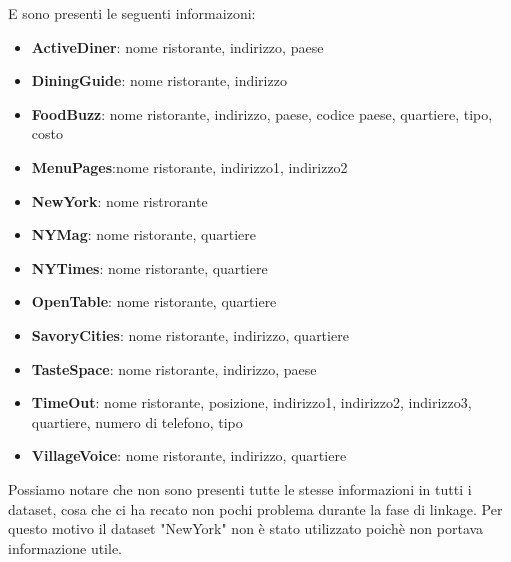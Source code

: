 \documentclass[a4paper,12pt]{article}
\begin{document}
E sono presenti le seguenti informaizoni: 
\begin{itemize}
\item \textbf{ActiveDiner}: nome ristorante, indirizzo, paese
\item \textbf{DiningGuide}: nome ristorante, indirizzo
\item \textbf{FoodBuzz}: nome ristorante, indirizzo, paese, codice paese, quartiere, tipo, costo
\item \textbf{MenuPages}:nome ristorante, indirizzo1, indirizzo2
\item \textbf{NewYork}: nome ristrorante
\item \textbf{NYMag}: nome ristorante, quartiere
\item \textbf{NYTimes}: nome ristorante, quartiere
\item \textbf{OpenTable}: nome ristorante, quartiere
\item \textbf{SavoryCities}: nome ristorante, indirizzo, quartiere
\item \textbf{TasteSpace}: nome ristorante, indirizzo, paese
\item \textbf{TimeOut}: nome ristorante, posizione, indirizzo1, indirizzo2, indirizzo3, quartiere, numero di telefono, tipo
\item \textbf{VillageVoice}: nome ristorante, indirizzo, quartiere
\end{itemize}

Possiamo notare che non sono presenti tutte le stesse informazioni in tutti i dataset, cosa che ci ha recato non pochi problema durante la fase di linkage. Per questo motivo il dataset "NewYork" non è stato utilizzato poichè non portava informazione utile.
\end{document}
